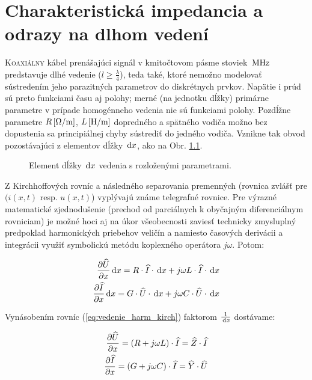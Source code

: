 \chapter{Charakteristická impedancia a odrazy na dlhom vedení}

\lettrine{K}{oaxiálny} kábel prenášajúci signál v kmitočtovom pásme stoviek $\, \mathrm{MHz}$ predstavuje dlhé vedenie ($l \geq \frac{\lambda}{4}$), \cite{tirpak} teda také, ktoré nemožno modelovať sústredením jeho parazitných parametrov do diskrétnych prvkov. Napätie i prúd sú preto funkciami času aj polohy; merné (na jednotku dĺžky) primárne parametre v prípade homogénneho vedenia nie sú funkciami polohy. Pozdĺžne parametre $R \, \mathrm{[\Omega/m]}$, $L\, \mathrm{[H/m]}$ dopredného a spätného vodiča možno bez dopustenia sa principiálnej chyby sústrediť do jedného vodiča. Vznikne tak obvod pozostávajúci z elementov dĺžky $\, \mathrm{d} x$, ako na Obr. \ref{fig:vedenie}.

\begin{figure}[!ht]
	\centering
	
	\caption{Element dĺžky $\, \mathrm{d} x$ vedenia s rozloženými parametrami.}
	\label{fig:vedenie}
\end{figure}
Z Kirchhoffových rovníc a následného separovania premenných (rovnica zvlášť pre $(i(x,t)$ resp. $u(x,t)$) vyplývajú známe telegrafné rovnice.
Pre výrazné matematické zjednodušenie (prechod od parciálnych k obyčajným diferenciálnym rovniciam) je možné hoci aj na úkor všeobecnosti zaviesť technicky zmysluplný predpoklad harmonických priebehov veličín a namiesto časových derivácii a integrácii využiť symbolickú metódu koplexného operátora $j \omega$. Potom:

\begin{subequations} \label{eq:vedenie_harm_kirch}
	\begin{align}
	\frac{\partial \widehat{U}}{\partial x} \, \mathrm{d} x = R \cdot \widehat{I} \cdot \, \mathrm{d} x + j\omega L \cdot \widehat{I} \cdot \, \mathrm{d} x\\
	\frac{\partial \widehat{I}}{\partial x} \, \mathrm{d} x = G \cdot \widehat{U} \cdot \, \mathrm{d} x + j\omega C \cdot \widehat{U} \cdot \, \mathrm{d} x
\end{align}
\end{subequations}

Vynásobením rovníc (\ref{eq:vedenie_harm_kirch}) faktorom $\frac{1}{\, \mathrm{d} x}$ dostávame:

\begin{subequations} \label{eq:vedenie_harm_duidx}
	\begin{align}
		\frac{\partial \widehat{U}}{\partial x} = (R + j\omega L) \cdot \widehat{I} = \widehat{Z} \cdot \widehat{I} \label{eq:vedenie_harm_duidx_U'=Z.I}\\
		\frac{\partial \widehat{I}}{\partial x} = (G + j\omega C) \cdot \widehat{I} = \widehat{Y} \cdot \widehat{U} \label{eq:vedenie_harm_duidx_I'=Y.U}
\end{align}
\end{subequations}

